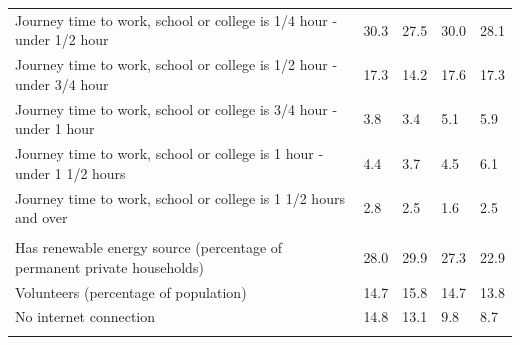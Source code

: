 \documentclass{article}
\begin{document}
\begin{table}[h]
\begin{tabular}{KTTTT}
Journey time to work, school or college is 1/4 hour - under 1/2 hour & 30.3& 27.5& 30.0& 28.1\\
Journey time to work, school or college is 1/2 hour - under 3/4 hour & 17.3& 14.2& 17.6& 17.3\\
Journey time to work, school or college is 3/4 hour - under 1 hour & 3.8& 3.4& 5.1& 5.9\\
Journey time to work, school or college is 1 hour - under 1 1/2 hours & 4.4& 3.7& 4.5& 6.1\\
Journey time to work, school or college is 1 1/2 hours and over & 2.8& 2.5& 1.6& 2.5\\
\hline
    \\ 
    \hline
Has renewable energy source (percentage of permanent private households) & 28.0& 29.9& 27.3& 22.9\\
    \hline
Volunteers (percentage of population) & 14.7& 15.8& 14.7& 13.8\\
    \hline
No internet connection& 14.8& 13.1&  9.8&  8.7\\
\hline
\end{tabular}
\end{table}
\end{document}
